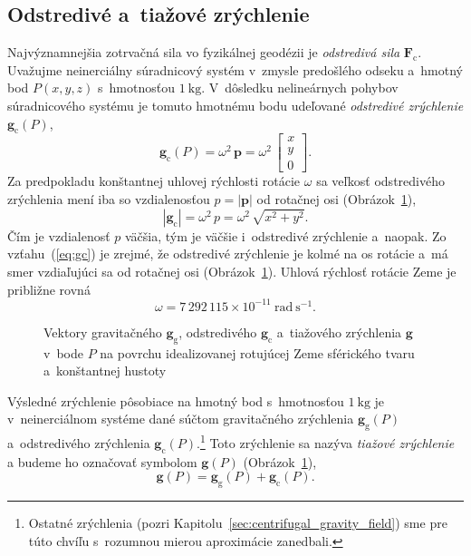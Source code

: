 \documentclass[a4paper, 12pt]{book}
\newcommand{\gidx}{\mathrm g}
\newcommand{\cidx}{\mathrm c}
\let\vec\mathbf
\begin{document}
\subsection{Odstredivé a~tiažové zrýchlenie}

Najvýznamnejšia zotrvačná sila vo fyzikálnej geodézii je \emph{odstredivá sila}
$\vec F_\cidx$.  Uvažujme neinerciálny súradnicový systém v~zmysle predošlého
odseku a~hmotný bod $P(x, y, z)$ s~hmotnosťou $1\ \mathrm{kg}$.  V~dôsledku
nelineárnych pohybov súradnicového systému je tomuto hmotnému bodu udeľované
\emph{odstredivé zrýchlenie} $\vec g_\cidx(P)$,
%
\begin{equation}
\label{eq:gc}
\vec g_\cidx(P) = \omega^2 \, \vec p =
%
\omega^2 \, \begin{bmatrix}
x\\
y\\
0
\end{bmatrix}
{.}
\end{equation}
%
Za predpokladu konštantnej uhlovej rýchlosti rotácie $\omega$ sa veľkosť
odstredivého zrýchlenia mení iba so vzdialenosťou $p = | \vec p |$ od rotačnej
osi (Obrázok~\ref{fig:gravity_vector}),
%
\begin{equation}
| \vec g_\cidx | = \omega^2 \, p = \omega^2 \, \sqrt{x^2 + y^2}{.}
\end{equation}
%
Čím je vzdialenosť $p$ väčšia, tým je väčšie i~odstredivé zrýchlenie a~naopak.
Zo vzťahu~(\ref{eq:gc}) je zrejmé, že odstredivé zrýchlenie je kolmé na os
rotácie a~má smer vzdiaľujúci sa od rotačnej osi
(Obrázok~\ref{fig:gravity_vector}).  Uhlová rýchlosť rotácie Zeme je približne
rovná \citep{GRS80}
%
\begin{equation}
\omega = 7\, 292\, 115 \times 10^{-11} \ \mathrm{rad} \ \mathrm{s}^{-1}{.}
\end{equation}

\begin{figure}
\centering

\caption{Vektory gravitačného $\vec g_\gidx$, odstredivého $\vec g_\cidx$
a~tiažového zrýchlenia $\vec g$ v~bode $P$ na povrchu idealizovanej rotujúcej
Zeme sférického tvaru a~konštantnej hustoty}
\label{fig:gravity_vector}
\end{figure}

Výsledné zrýchlenie pôsobiace na hmotný bod s~hmotnosťou $1 \ \mathrm{kg}$ je
v~neinerciálnom systéme dané súčtom gravitačného zrýchlenia $\vec g_\gidx(P)$
a~odstredivého zrýchlenia $\vec g_\cidx(P)$.\footnote{Ostatné zrýchlenia (pozri
Kapitolu~\ref{sec:centrifugal_gravity_field}) sme pre túto chvíľu s~rozumnou
mierou aproximácie zanedbali.}  Toto zrýchlenie sa nazýva \emph{tiažové
zrýchlenie} a budeme ho označovať symbolom $\vec g(P)$
(Obrázok~\ref{fig:gravity_vector}),
%
\begin{equation}
\label{eq:g}
\vec g(P) = \vec g_\gidx(P) + \vec g_\cidx(P){.}
\end{equation}
\end{document}
